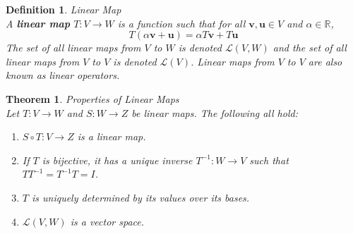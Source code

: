 \documentclass[12pt]{article}
\newtheorem{thm}{Theorem}[section] %
\theoremstyle{plain}
\newtheorem{definition}{Definition}[section]
\newcommand{\R}{\mathbb{R}}
\newcommand{\vv}{\mathbf{v}}
\newcommand{\vu}{\mathbf{u}}
\newcommand{\Lagr}{\mathcal{L}}
\begin{document}
    \begin{definition}{Linear Map}
        ~\\A \textbf{linear map} $T:V \to W$ is a function such that for all $\vv, \vu \in V$ and $\alpha \in \R$, $$T(\alpha \vv + \vu) = \alpha T \vv + T \vu$$
        The set of all linear maps from $V$ to $W$ is denoted $\Lagr(V, W)$ and the set of all linear maps from $V$ to $V$ is denoted $\Lagr(V)$. Linear maps from $V$ to $V$ are also known as linear operators.
    \end{definition}

    \begin{thm}{Properties of Linear Maps}
        ~\\Let $T:V \to W$ and $S:W \to Z$ be linear maps. The following all hold:
        \begin{enumerate}
            \item $S \circ T:V \to Z$ is a linear map.
            \item If $T$ is bijective, it has a unique inverse $T^{-1}:W \to V$ such that $TT^{-1} = T^{-1}T = I$.
            \item $T$ is uniquely determined by its values over its bases.
            \item $\Lagr(V, W)$ is a vector space.
        \end{enumerate}
    \end{thm}
\end{document}
